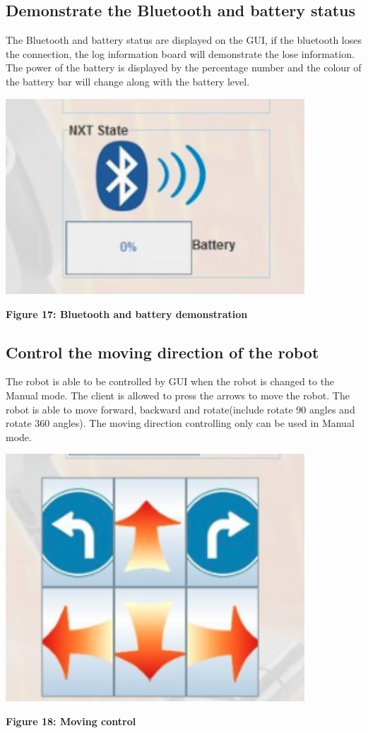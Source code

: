 \documentclass[11pt, a4paper]{report}
\begin{document}
\subsection{Demonstrate the Bluetooth and battery status}
The Bluetooth and battery status are displayed on the GUI, if the bluetooth loses the connection, the log information board will demonstrate the lose information. The power of the battery is displayed by the percentage number and the colour of the battery bar will change along with the battery level.
 \begin{center}
 \includegraphics[width=11.20cm]{bluetooth_battery}
\end{center}
\begin{center}
\textbf {Figure 17: Bluetooth and battery demonstration } \\[0.3cm]
\end{center}
\subsection{Control the moving direction of the robot}
The robot is able to be controlled by GUI when the robot is changed to the Manual mode. The client is allowed to press the arrows to move the robot. The robot is able to move forward, backward and rotate(include rotate 90 angles and rotate 360 angles). The moving direction controlling only can be used in Manual mode.
 \begin{center}
 \includegraphics[width=11.20cm]{direction}
\end{center}
\begin{center}
\textbf {Figure 18: Moving control} \\[0.3cm]
\end{center}
\end{document}
